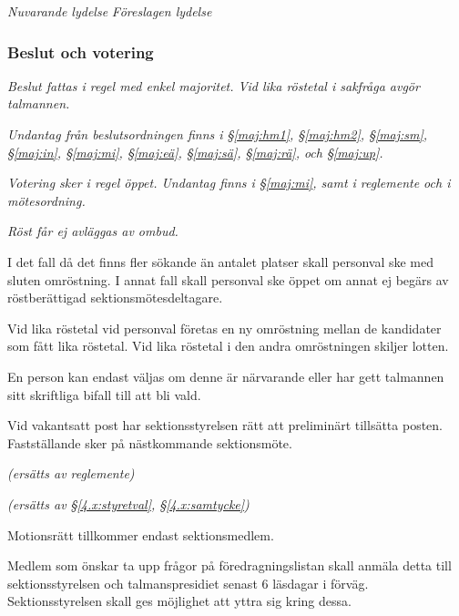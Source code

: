 \documentclass{article}
\newenvironment{lydelse}
    {\begin{paracol}{2}%
        \emph{Nuvarande lydelse}%
        \switchcolumn%
        \emph{Föreslagen lydelse}%
    \end{paracol}%
    \begin{enumerate}[label=\thesubsection.\arabic*]%
    \begin{paracol}{2}%
    }{\end{paracol}\end{enumerate}}
\begin{document}
\begin{lydelse}
  \switchcolumn
  \subsubsection*{Beslut och votering}
  \item \emph{Beslut fattas i regel med enkel majoritet. Vid lika röstetal i sakfråga avgör talmannen.}
  \item \emph{Undantag från beslutsordningen finns i \S\ref{maj:hm1}, \S\ref{maj:hm2}, \S\ref{maj:sm}, \S\ref{maj:in}, \S\ref{maj:mi}, \S\ref{maj:eä}, \S\ref{maj:sä}, \S\ref{maj:rä}, och \S\ref{maj:up}.}
  \item \emph{Votering sker i regel öppet. Undantag finns i \S\ref{maj:mi}, samt i reglemente och i mötesordning.}
  \item \emph{Röst får ej avläggas av ombud.}

  \switchcolumn*
  \setcounter{subsection}{12}
  \setcounter{enumi}{0}
  \item I det fall då det finns fler sökande än antalet platser skall personval ske med sluten omröstning. I annat fall skall personval ske öppet om annat ej begärs av röstberättigad sektionsmötesdeltagare.
  
  \item Vid lika röstetal vid personval företas en ny omröstning mellan de kandidater som fått lika röstetal. Vid lika röstetal i den andra omröstningen skiljer lotten.
  
  \item En person kan endast väljas om denne är närvarande eller har gett talmannen sitt skriftliga bifall till att bli vald.
  
  \setcounter{subsection}{13}
  \setcounter{enumi}{0}
  \item Vid vakantsatt post har sektions\-styr\-elsen rätt att preliminärt tillsätta posten. Fastställande sker på näst\-komm\-ande sektionsmöte.

  
  \switchcolumn
  \item[] \emph{(ersätts av reglemente)}
  \item[] \emph{(ersätts av \S\ref{4.x:styretval}, \S\ref{4.x:samtycke})}

  \switchcolumn*
  \setcounter{subsection}{17} 
  \setcounter{enumi}{0}
  \item Motionsrätt tillkommer endast sektionsmedlem.

  \item Medlem som önskar ta upp frågor på föredragningslistan skall
  anmäla detta till sektionsstyrelsen och talmanspresidiet senast 6 läsdagar i förväg. Sektionsstyrelsen skall ges möjlighet att yttra sig kring dessa.
    

\end{lydelse}
\end{document}
